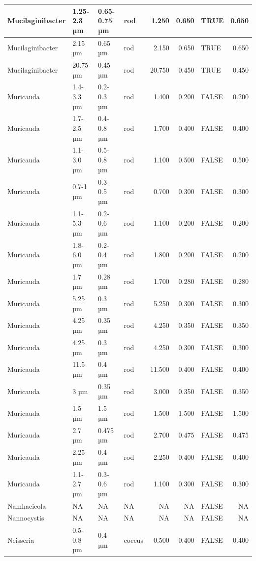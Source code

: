 \documentclass[
]{article}
\begin{document}
\begin{table}
\begin{tabular}{l|l|l|l|r|r|l|r}
\hline
Mucilaginibacter & 1.25-2.3 µm & 0.65-0.75 µm & rod & 1.250 & 0.650 & TRUE & 0.650\\
\hline
Mucilaginibacter & 2.15 µm & 0.65 µm & rod & 2.150 & 0.650 & TRUE & 0.650\\
\hline
Mucilaginibacter & 20.75 µm & 0.45 µm & rod & 20.750 & 0.450 & TRUE & 0.450\\
\hline
Muricauda & 1.4-3.3 µm & 0.2-0.3 µm & rod & 1.400 & 0.200 & FALSE & 0.200\\
\hline
Muricauda & 1.7-2.5 µm & 0.4-0.8 µm & rod & 1.700 & 0.400 & FALSE & 0.400\\
\hline
Muricauda & 1.1-3.0 µm & 0.5-0.8 µm & rod & 1.100 & 0.500 & FALSE & 0.500\\
\hline
Muricauda & 0.7-1 µm & 0.3-0.5 µm & rod & 0.700 & 0.300 & FALSE & 0.300\\
\hline
Muricauda & 1.1-5.3 µm & 0.2-0.6 µm & rod & 1.100 & 0.200 & FALSE & 0.200\\
\hline
Muricauda & 1.8-6.0 µm & 0.2-0.4 µm & rod & 1.800 & 0.200 & FALSE & 0.200\\
\hline
Muricauda & 1.7 µm & 0.28 µm & rod & 1.700 & 0.280 & FALSE & 0.280\\
\hline
Muricauda & 5.25 µm & 0.3 µm & rod & 5.250 & 0.300 & FALSE & 0.300\\
\hline
Muricauda & 4.25 µm & 0.35 µm & rod & 4.250 & 0.350 & FALSE & 0.350\\
\hline
Muricauda & 4.25 µm & 0.3 µm & rod & 4.250 & 0.300 & FALSE & 0.300\\
\hline
Muricauda & 11.5 µm & 0.4 µm & rod & 11.500 & 0.400 & FALSE & 0.400\\
\hline
Muricauda & 3 µm & 0.35 µm & rod & 3.000 & 0.350 & FALSE & 0.350\\
\hline
Muricauda & 1.5 µm & 1.5 µm & rod & 1.500 & 1.500 & FALSE & 1.500\\
\hline
Muricauda & 2.7 µm & 0.475 µm & rod & 2.700 & 0.475 & FALSE & 0.475\\
\hline
Muricauda & 2.25 µm & 0.4 µm & rod & 2.250 & 0.400 & FALSE & 0.400\\
\hline
Muricauda & 1.1-2.7 µm & 0.3-0.6 µm & rod & 1.100 & 0.300 & FALSE & 0.300\\
\hline
Namhaeicola & NA & NA & NA & NA & NA & FALSE & NA\\
\hline
Nannocystis & NA & NA & NA & NA & NA & FALSE & NA\\
\hline
Neisseria & 0.5-0.8 µm & 0.4 µm & coccus & 0.500 & 0.400 & FALSE & 0.400\\

\end{tabular}
\end{table}
\end{document}
